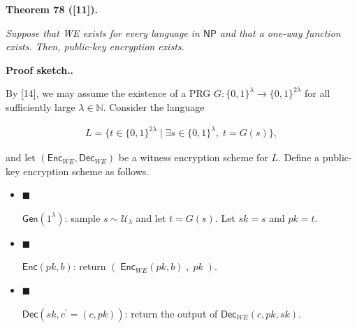 



\par\medskip\noindent\textbf{
\textbf{Theorem 78}\textbf{ }([11])\textbf{.}
}\par



\emph{Suppose that WE exists for every language in ${\mathsf{NP}}$ and that a one-way function exists. Then, public-key encryption exists.}\par






\par\medskip\noindent\textbf{Proof sketch..}\par




By [14], we may assume the existence of a PRG $G:\{0,1\}^{\lambda}\to\{0,1\}^{2\lambda}$ for all sufficiently large $\lambda\in\mathbb{N}$. Consider the language\par


\[\begin{gathered}
L=\{t\in\{0,1\}^{2\lambda}\mid\exists s\in\{0,1\}^{\lambda},\;t=G(s)\},
\end{gathered}\]


and let $({\mathsf{Enc}}_{WE},{\mathsf{Dec}}_{WE})$ be a witness encryption scheme for $L$. Define a public-key encryption scheme as follows.\par


\begin{itemize}


\item[] 
$\blacksquare$ 


${\mathsf{Gen}}(1^{\lambda})$: sample $s\sim\mathcal{U}_{\lambda}$ and let $t=G(s)$. Let $sk=s$ and $pk=t$.\par





\item[] 
$\blacksquare$ 


${\mathsf{Enc}}(pk,b)$: return $(\;{\mathsf{Enc}}_{WE}(pk,b)\;,\;pk\;)$.\par





\item[] 
$\blacksquare$ 


${\mathsf{Dec}}(sk,c^{\prime}=(c,pk))$: return the output of ${\mathsf{Dec}}_{WE}(c,pk,sk)$.\par





\end{itemize}


